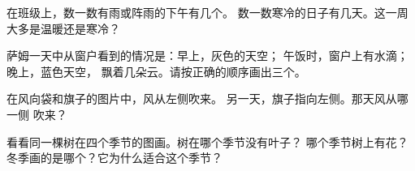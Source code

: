 \begin{exercise}[$\star\star$]\label{exo:g1:watching-the-weather:8}
在班级上，数一数有雨或阵雨的下午有几个。
数一数寒冷的日子有几天。这一周大多是温暖还是寒冷？
\end{exercise}

\begin{exercise}[$\star\star$]\label{exo:g1:watching-the-weather:9}
萨姆一天中从窗户看到的情况是：早上，灰色的天空；
午饭时，窗户上有水滴；晚上，蓝色天空，
飘着几朵云。请按正确的顺序画出三个。
\end{exercise}

\begin{exercise}[$\star\star$]\label{exo:g1:watching-the-weather:10}
在风向袋和旗子的图片中，风从左侧吹来。
另一天，旗子指向左侧。那天风从哪一侧
吹来？
\end{exercise}

\begin{exercise}[$\star\star$]\label{exo:g1:watching-the-weather:11}
看看同一棵树在四个季节的图画。树在哪个季节没有叶子？
哪个季节树上有花？
冬季画的是哪个？它为什么适合这个季节？
\end{exercise}
